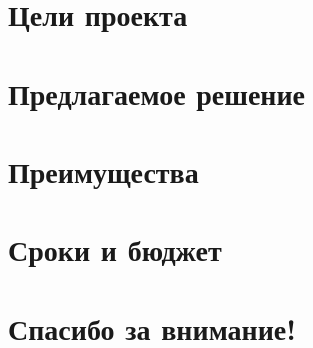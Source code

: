 \documentclass[c]{beamer}  %
\begin{document}
\begin{frame}
\frametitle{\insertsection} 
\framesubtitle{\insertsubsection}
\end{frame}


\section{Цели проекта}

\begin{frame}
\frametitle{\insertsection} 
\framesubtitle{\insertsubsection}
\end{frame}


\section{Предлагаемое решение}

\begin{frame}
\frametitle{\insertsection} 
\framesubtitle{\insertsubsection}
\end{frame}


\section{Преимущества}

\begin{frame}
\frametitle{\insertsection} 
\framesubtitle{\insertsubsection}
\end{frame}


\section{Сроки и бюджет}

\begin{frame}
\frametitle{\insertsection} 
\framesubtitle{\insertsubsection}
\end{frame}


\section{Спасибо за внимание!}

\begin{frame}
\frametitle{\insertsection} 
\framesubtitle{\insertsubsection}
\end{frame}
\end{document}

